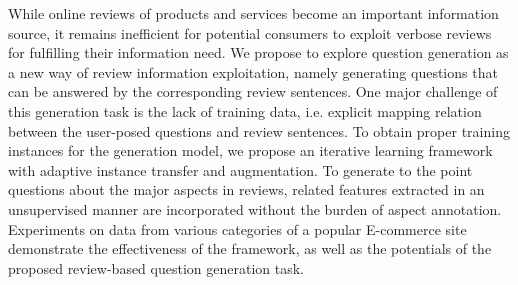 While online reviews of products and services become an important information source, it remains inefficient for potential consumers to exploit verbose reviews for fulfilling their information need. We propose to explore question generation as a new way of review information exploitation, namely generating questions that can be answered by the corresponding review sentences. One major challenge of this generation task is the lack of training data, i.e. explicit mapping relation between the user-posed questions and review sentences. To obtain proper training instances for the generation model, we propose an iterative learning framework with adaptive instance transfer and augmentation. To generate to the point questions about the major aspects in reviews, related features extracted in an unsupervised manner are incorporated without the burden of aspect annotation. Experiments on data from various categories of a popular E-commerce site demonstrate the effectiveness of the framework, as well as the potentials of the proposed review-based question generation task.
